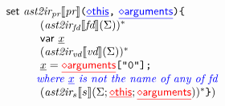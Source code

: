 \[\begin{array}{l@{~}l@{~}l}
{\sf set} \ \atoiPRfd{\prop} \verb+(+{\inblue\newvar{this}}\verb+,+\ {\inblue\newvar{arguments}}\verb+)+
\verb+{+\\
\quad\quad\quad(\atoiFDfd{\fd})^*\\
\quad\quad\quad{\sf var}\ \ir{x}\\
\quad\quad\quad(\atoiVDf{\vd}\env)^*\\
\quad\quad\quad
\ir{x} = {\inred\newvar{arguments}}\verb+["0"];+\\
\quad\quad\note{where \ir{x} is not the name of any of \mbox{fd}}\\
\quad\quad\quad(\atoiSf{\stmt}{\env; {\inred\newvar{this}}; {\inred\newvar{arguments}}})^*
\verb+}+
)
\end{array}
\]

